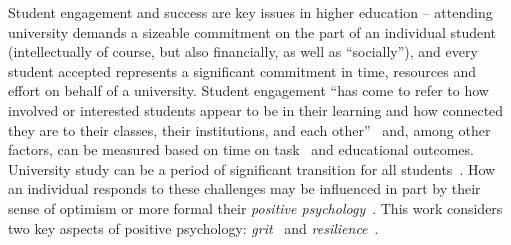 \documentclass[sigconf]{acmart}
\begin{document}

Student engagement and success are key issues in higher education -- attending university demands a sizeable commitment on the part of an individual student (intellectually of course, but also financially, as well as ``socially''), and every student accepted represents a significant commitment in time, resources and effort on behalf of a university. Student engagement ``has come to refer to how involved or interested students appear to be in their learning and how connected they are to their classes, their institutions, and each other''~\citep[p.~38]{Axelson2010} and, among other factors, can be measured based on time on task~\cite{kuh2009national} and educational outcomes. University study can be a period of significant transition for all students~\cite{Tinto1975}. How an individual responds to these challenges may be influenced in part by their sense of optimism or more formal their {\em positive psychology}~\cite{Seligman90}. This work considers two key aspects of positive psychology: {\em{grit}}~\cite{Duckworth2007,Duckworth2016} and {\em resilience}~\cite{Clarke2010}.  

\end{document}
